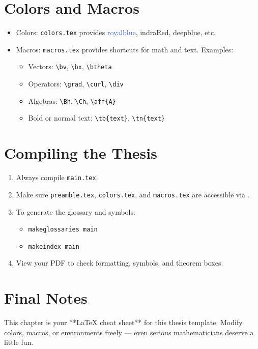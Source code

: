 \section{Colors and Macros}
\begin{itemize}
    \item Colors: \verb|colors.tex| provides \textcolor{royalblue}{royalblue}, \textcolor{indraRed}{indraRed}, \textcolor{deepblue}{deepblue}, etc.
    \item Macros: \verb|macros.tex| provides shortcuts for math and text. Examples:
    \begin{itemize}
        \item Vectors: \verb|\bv|, \verb|\bx|, \verb|\btheta|
        \item Operators: \verb|\grad|, \verb|\curl|, \verb|\div|
        \item Algebras: \verb|\Bh|, \verb|\Ch|, \verb|\aff{A}|
        \item Bold or normal text: \verb|\tb{text}|, \verb|\tn{text}|
    \end{itemize}
\end{itemize}

\section{Compiling the Thesis}
\begin{enumerate}
    \item Always compile \verb|main.tex|.
    \item Make sure \verb|preamble.tex|, \verb|colors.tex|, and \verb|macros.tex| are accessible via \verb||.
    \item To generate the glossary and symbols:
    \begin{itemize}
        \item \verb|makeglossaries main|
        \item \verb|makeindex main|
    \end{itemize}
    \item View your PDF to check formatting, symbols, and theorem boxes.
\end{enumerate}

\section{Final Notes}
This chapter is your **LaTeX cheat sheet** for this thesis template. Modify colors, macros, or environments freely — even serious mathematicians deserve a little fun.
